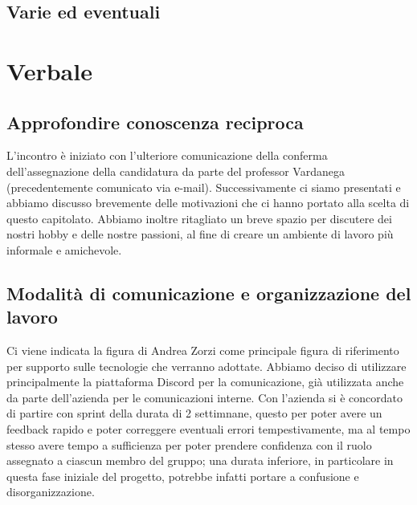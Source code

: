 \documentclass[italian,12pt]{article}
\begin{document}
\subsection{Varie ed eventuali}

\newpage

\section{Verbale}

\subsection{Approfondire conoscenza reciproca}
L'incontro è iniziato con l'ulteriore comunicazione della conferma dell'assegnazione 
della candidatura da parte del professor Vardanega (precedentemente comunicato via e-mail). 
Successivamente ci siamo presentati e abbiamo discusso brevemente delle motivazioni 
che ci hanno portato alla scelta di questo capitolato. Abbiamo inoltre ritagliato un breve spazio 
per discutere dei nostri hobby e delle nostre passioni, al fine di creare un ambiente di lavoro 
più informale e amichevole.

\subsection{Modalità di comunicazione e organizzazione del lavoro}
Ci viene indicata la figura di Andrea Zorzi come principale figura di riferimento per 
supporto sulle tecnologie che verranno adottate. Abbiamo deciso di utilizzare principalmente 
la piattaforma Discord per la comunicazione, già utilizzata anche da parte dell'azienda per 
le comunicazioni interne. Con l'azienda si è concordato di partire con sprint della durata 
di 2 settimnane, questo per poter avere un feedback rapido e poter correggere eventuali errori 
tempestivamente, ma al tempo stesso avere tempo a sufficienza per poter prendere confidenza 
con il ruolo assegnato a ciascun membro del gruppo; una durata inferiore, in particolare 
in questa fase iniziale del progetto, potrebbe infatti portare a confusione e disorganizzazione.
\end{document}

